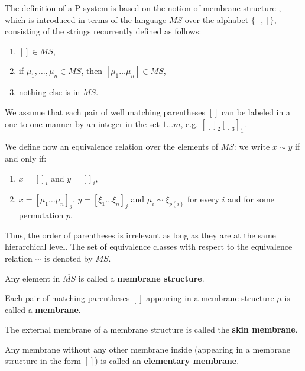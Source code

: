 The definition of a P system is based on the notion of  membrane structure \cite{Besozzi:PhD:2004}, which is introduced in terms of the language $MS$ over the alphabet $\{[, ]\}$, consisting of the strings recurrently defined as follows:
\begin{enumerate}
  \item $[]\in MS$,
  \item if $\mu_1, \ldots, \mu_n \in MS$, then $[\mu_1\ldots\mu_n] \in MS$,
  \item nothing else is in $MS$.
\end{enumerate}

We assume that each pair of well matching parentheses $[]$ can be labeled in a one-to-one manner by an integer in the set $1\ldots m$, e.g. $[[]_2[]_3]_1$.

We define now an equivalence relation over the elements of $MS$: we write $x\sim y$ if and only if:
\begin{enumerate}
  \item $x=[]_i$ and $y=[]_i$,
  \item $x=[\mu_1\ldots\mu_n]_j$, $y=[\xi_1\ldots\xi_n]_j$ and $\mu_i\sim\xi_{p(i)}$ for every $i$ and for some permutation $p$.
\end{enumerate}

Thus, the order of parentheses is irrelevant as long as they are at the same hierarchical level. The set of equivalence classes with respect to the equivalence relation $\sim$ is denoted by $\overline{MS}$.

\begin{definition}
  Any element in $\overline{MS}$ is called a {\bf membrane structure}.
\end{definition}

\begin{definition}
  Each pair of matching parentheses $[]$ appearing in a membrane structure $\mu$ is called a  {\bf membrane}.
\end{definition}

\begin{definition}
  The external membrane of a membrane structure is called the  {\bf skin membrane}.
\end{definition}

\begin{definition}
  Any membrane without any other membrane inside (appearing in a membrane structure in the form $[]$) is called an  {\bf elementary membrane}.
\end{definition}

